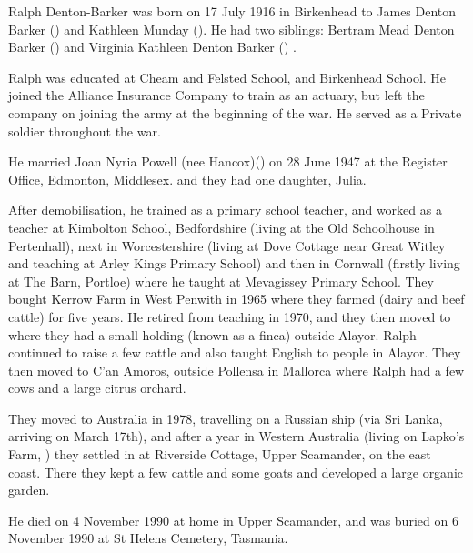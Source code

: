 
Ralph Denton-Barker was born on 17 July 1916 in Birkenhead to James Denton Barker () and
Kathleen Munday (). He had two siblings: Bertram Mead Denton Barker () and Virginia Kathleen Denton Barker () \cite{BMDIndex_RalphMundayDentonBarker_birth}.

Ralph was educated at Cheam and Felsted School, and Birkenhead School. He joined the Alliance Insurance Company to train as an actuary, but left the company on joining the army at the beginning of the war. He served as a Private soldier throughout the war. 

He married Joan Nyria Powell (nee Hancox)() on 28 June 1947 at the Register Office, Edmonton, Middlesex.\cite{MarriageCertRalphDentonBarkerJoanNyriaPowell} and they had one daughter, Julia.

After demobilisation, he trained as a primary school teacher, and worked as a teacher at Kimbolton School,  Bedfordshire (living at the Old Schoolhouse in Pertenhall), next in  Worcestershire (living at Dove Cottage near Great Witley and teaching at Arley Kings Primary School) and then in Cornwall (firstly living at The Barn, Portloe) where he taught at Mevagissey Primary School.  They  bought Kerrow Farm in West Penwith in 1965 where they farmed (dairy and beef cattle) for five years. 
He retired from teaching in 1970, and they then moved to  where they had a small holding (known as a finca) outside Alayor. Ralph continued to raise a few cattle and also taught English to people in Alayor.  They then moved to C'an Amoros, outside Pollensa in Mallorca where Ralph had a few cows and a large citrus orchard.

They moved to Australia in 1978, travelling on a Russian ship (via Sri Lanka, arriving on March 17th), and after a year in Western Australia (living on Lapko's Farm, ) they settled in  at Riverside Cottage, Upper Scamander, on the east coast. There they kept a few cattle and some goats and developed a large organic garden.

He died on 4 November 1990\cite{RMDBarkerDeath, RalphDeathCert} at home in Upper Scamander, and was buried on 6 November 1990 at St Helens Cemetery, Tasmania.

